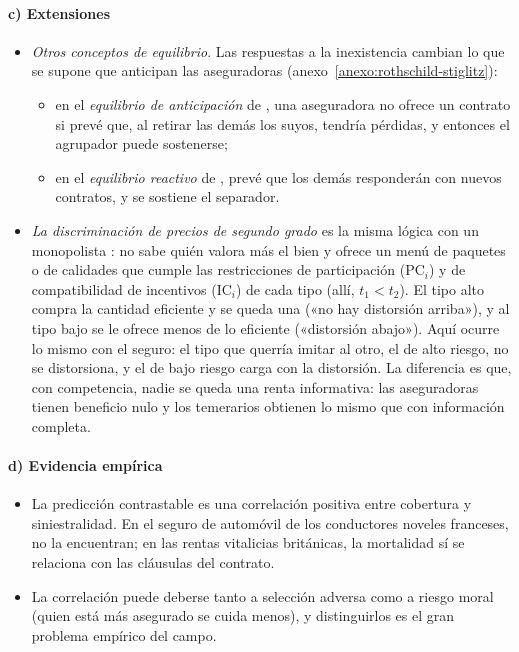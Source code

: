 \documentclass[11pt]{article}
\begin{document}
\paragraph{c) Extensiones}

\begin{itemize}
\item \emph{Otros conceptos de equilibrio}. Las respuestas a la inexistencia cambian lo que se supone que anticipan las aseguradoras (anexo~\ref{anexo:rothschild-stiglitz}):
  \begin{itemize}
  \item en el \emph{equilibrio de anticipación} de \textcite{Wilson1977Model}, una aseguradora no ofrece un contrato si prevé que, al retirar las demás los suyos, tendría pérdidas, y entonces el agrupador puede sostenerse;
  \item en el \emph{equilibrio reactivo} de \textcite{Riley1979Informational}, prevé que los demás responderán con nuevos contratos, y se sostiene el separador.
  \end{itemize}
\item \emph{La discriminación de precios de segundo grado} es la misma lógica con un monopolista : no sabe quién valora más el bien y ofrece un menú de paquetes o de calidades que cumple las restricciones de participación ($\mathrm{PC}_i$) y de compatibilidad de incentivos ($\mathrm{IC}_i$) de cada tipo (allí, $t_1<t_2$). El tipo alto compra la cantidad eficiente y se queda una  («no hay distorsión arriba»), y al tipo bajo se le ofrece menos de lo eficiente («distorsión abajo»)\nocite{MussaRosen1978Monopoly,MaskinRiley1984Monopoly}. Aquí ocurre lo mismo con el seguro: el tipo que querría imitar al otro, el de alto riesgo, no se distorsiona, y el de bajo riesgo carga con la distorsión. La diferencia es que, con competencia, nadie se queda una renta informativa: las aseguradoras tienen beneficio nulo y los temerarios obtienen lo mismo que con información completa.
\end{itemize}

\paragraph{d) Evidencia empírica}

\begin{itemize}
\item La predicción contrastable es una correlación positiva entre cobertura y siniestralidad. En el seguro de automóvil de los conductores noveles franceses, \textcite{ChiapporiSalanie2000Testing} no la encuentran; en las rentas vitalicias británicas, la mortalidad sí se relaciona con las cláusulas del contrato\nocite{FinkelsteinPoterba2004Adverse}.
\item La correlación puede deberse tanto a selección adversa como a riesgo moral (quien está más asegurado se cuida menos), y distinguirlos es el gran problema empírico del campo\nocite{EinavFinkelstein2011Selection}.
\end{itemize}
\end{document}

